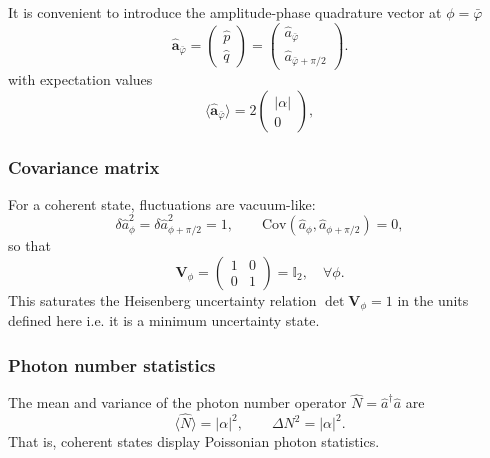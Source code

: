 It is convenient to introduce the amplitude-phase quadrature vector at $\phi = \bar{\varphi}$
\begin{equation}
\hat{\mathbf a}_{\bar{\varphi}} =
\begin{pmatrix}
\hat{p} \\[2pt]
\hat{q}
\end{pmatrix}
=
\begin{pmatrix}
\hat{a}_{\bar{\varphi}} \\[2pt]
\hat{a}_{\bar{\varphi}+\pi/2}
\end{pmatrix}.
\end{equation}
with expectation values
\begin{equation}
\langle \hat{\mathbf a}_{\bar{\varphi}} \rangle
=
2\begin{pmatrix}
|\alpha| \\[2pt]
0
\end{pmatrix},
\end{equation}



\subsubsection*{Covariance matrix}
For a coherent state, fluctuations are vacuum-like:
\begin{equation}
\delta \hat{a}_\phi^2 = \delta \hat{a}_{\phi+\pi/2}^2 = 1,
\qquad
\mathrm{Cov}(\hat{a}_\phi,\hat{a}_{\phi+\pi/2}) = 0,
\end{equation}
so that
\begin{equation}
\mathbf V_\phi =
\begin{pmatrix}
1 & 0\\
0 & 1
\end{pmatrix}
= \mathbb{I}_2,
\quad \forall \phi .
\label{II.CS.3}
\end{equation}
This saturates the Heisenberg uncertainty relation $\det \mathbf V_\phi = 1$ in the units defined here i.e. it is a minimum uncertainty state. 

\subsubsection*{Photon number statistics}

The mean and variance of the photon number operator $\hat{N}=\hat{a}^\dagger\hat{a}$ are
\begin{equation}
\langle \hat{N} \rangle = |\alpha|^2,
\qquad
\Delta N^2 = |\alpha|^2.
\label{II.19}
\end{equation}
That is, coherent states display Poissonian photon statistics.


